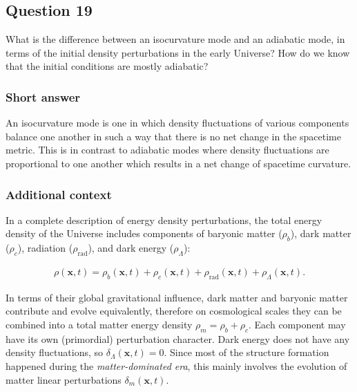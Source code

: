 \documentclass[a4paper,11pt]{article}
\begin{document}
%
%

\newpage
\subsection{Question 19}

What is the difference between an isocurvature mode and an adiabatic mode, in terms of the initial density perturbations in the early Universe? How do we know that the initial conditions are mostly adiabatic?

\subsubsection{Short answer}

An isocurvature mode is one in which density fluctuations of various components balance one another in such a way that there is no net change in the spacetime metric. This is in contrast to adiabatic modes where density fluctuations are proportional to one another which results in a net change of spacetime curvature. 

\subsubsection{Additional context}

In a complete description of energy density perturbations, the total energy density of the Universe includes components of baryonic matter ($\rho_b$), dark matter ($\rho_c$), radiation ($\rho_\mathrm{rad}$), and dark energy ($\rho_\Lambda$):

\begin{align*}
    \rho(\mathbf{x},t) = \rho_b(\mathbf{x},t) + \rho_c(\mathbf{x},t) + \rho_\mathrm{rad}(\mathbf{x},t) + \rho_\Lambda(\mathbf{x},t).
\end{align*}

{\noindent}In terms of their global gravitational influence, dark matter and baryonic matter contribute and evolve equivalently, therefore on cosmological scales they can be combined into a total matter energy density $\rho_m = \rho_b + \rho_c$. Each component may have its own (primordial) perturbation character. Dark energy does not have any density fluctuations, so $\delta_\Lambda(\mathbf{x},t) = 0$. Since most of the structure formation happened during the \textit{matter-dominated era}, this mainly involves the evolution of matter linear perturbations $\delta_m(\mathbf{x},t)$.
\end{document}

